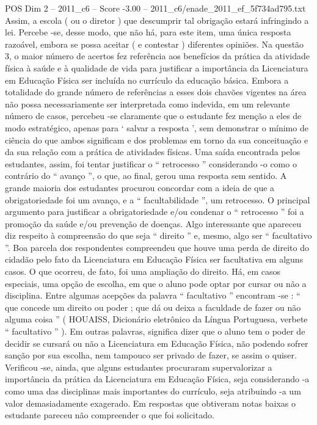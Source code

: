\begin{textsample}{POS Dim 2 – 2011\_c6 – Score -3.00 – 2011\_c6/enade\_2011\_ef\_5f734ad795.txt}
Assim, a escola ( ou o diretor ) que descumprir tal obrigação estará infringindo a lei.
Percebe -se, desse modo, que não há, para este item, uma única resposta razoável, embora se possa aceitar ( e contestar ) diferentes opiniões.
Na questão 3, o maior número de acertos fez referência aos benefícios da prática da atividade física à saúde e à qualidade de vida para justificar a importância da Licenciatura em Educação Física ser incluída no currículo da educação básica.
Embora a totalidade do grande número de referências a esses dois chavões vigentes na área não possa necessariamente ser interpretada como indevida, em um relevante número de casos, percebeu -se claramente que o estudante fez menção a eles de modo estratégico, apenas para ‘ salvar a resposta ’, sem demonstrar o mínimo de ciência do que ambos significam e dos problemas em torno da sua conceituação e da sua relação com a prática de atividades físicas.
Uma saída encontrada pelos estudantes, assim, foi tentar justificar o “ retrocesso ” considerando -o como o contrário do “ avanço ”, o que, ao final, gerou uma resposta sem sentido.
A grande maioria dos estudantes procurou concordar com a ideia de que a obrigatoriedade foi um avanço, e a “ facultabilidade ”, um retrocesso.
O principal argumento para justificar a obrigatoriedade e/ou condenar o “ retrocesso ” foi a promoção da saúde e/ou prevenção de doenças.
Algo interessante que apareceu diz respeito à compreensão do que seja “ direito ” e, mesmo, algo ser “ facultativo ”.
Boa parcela dos respondentes compreendeu que houve uma perda de direito do cidadão pelo fato da Licenciatura em Educação Física ser facultativa em alguns casos.
O que ocorreu, de fato, foi uma ampliação do direito.
Há, em casos especiais, uma opção de escolha, em que o aluno pode optar por cursar ou não a disciplina.
Entre algumas acepções da palavra “ facultativo ” encontram -se : “ que concede um direito ou poder ; que dá ou deixa a faculdade de fazer ou não alguma coisa ” ( HOUAISS, Dicionário eletrônico da Língua Portuguesa, verbete “ facultativo ” ).
Em outras palavras, significa dizer que o aluno tem o poder de decidir se cursará ou não a Licenciatura em Educação Física, não podendo sofrer sanção por sua escolha, nem tampouco ser privado de fazer, se assim o quiser.
Verificou -se, ainda, que alguns estudantes procuraram supervalorizar a importância da prática da Licenciatura em Educação Física, seja considerando -a como uma das disciplinas mais importantes do currículo, seja atribuindo -a um valor demasiadamente exagerado.
Em respostas que obtiveram notas baixas o estudante pareceu não compreender o que foi solicitado.

\end{textsample}
